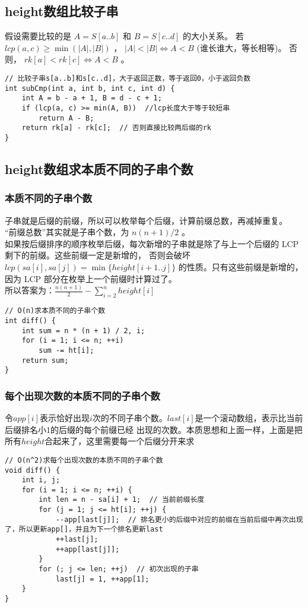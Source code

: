     \subsection{height数组比较子串}
        假设需要比较的是 $A=S[a..b]$ 和 $B=S[c..d]$ 的大小关系。
        若 $lcp(a, c)\ge\min(|A|, |B|)$ ， $|A|<|B|\iff A<B$ (谁长谁大，等长相等)。
        否则， $rk[a]< rk[c]\iff A<B$ 。
\begin{lstlisting}
// 比较子串s[a..b]和s[c..d]，大于返回正数，等于返回0，小于返回负数
int subCmp(int a, int b, int c, int d) {
    int A = b - a + 1, B = d - c + 1;
    if (lcp(a, c) >= min(A, B))  //lcp长度大于等于较短串
        return A - B;
    return rk[a] - rk[c];  // 否则直接比较两后缀的rk
}
\end{lstlisting}
    \subsection{height数组求本质不同的子串个数}
        \subsubsection{本质不同的子串个数}
            子串就是后缀的前缀，所以可以枚举每个后缀，计算前缀总数，再减掉重复。\\
            “前缀总数”其实就是子串个数，为 $n(n+1)/2$ 。\\
            如果按后缀排序的顺序枚举后缀，每次新增的子串就是除了与上一个后缀的 LCP 剩下的前缀。这些前缀一定是新增的，
            否则会破坏 $lcp(sa[i],sa[j])=\min\{height[i+1..j]\}$ 的性质。只有这些前缀是新增的，因为 LCP 部分在枚举上一个前缀时计算过了。\\
            所以答案为：$\frac{n(n+1)}{2}-\sum\limits_{i=2}^nheight[i]$ 
\begin{lstlisting}
// O(n)求本质不同的子串个数
int diff() {
    int sum = n * (n + 1) / 2, i;
    for (i = 1; i <= n; ++i)
        sum -= ht[i];
    return sum;
}
\end{lstlisting}
        \subsubsection{每个出现次数的本质不同的子串个数}
            令$app[i]$表示恰好出现$i$次的不同子串个数。$last[i]$是一个滚动数组，表示比当前后缀排名小1的后缀的每个前缀已经
            出现的次数。本质思想和上面一样，上面是把所有$height$合起来了，这里需要每一个后缀分开来求
\begin{lstlisting}
// O(n^2)求每个出现次数的本质不同的子串个数
void diff() {
    int i, j;
    for (i = 1; i <= n; ++i) {
        int len = n - sa[i] + 1;  // 当前前缀长度
        for (j = 1; j <= ht[i]; ++j) {
            --app[last[j]];  // 排名更小的后缀中对应的前缀在当前后缀中再次出现了，所以更新app[]，并且为下一个排名更新last
            ++last[j];
            ++app[last[j]];
        }
        for (; j <= len; ++j)  // 初次出现的子串
            last[j] = 1, ++app[1];
    }
}
\end{lstlisting}
